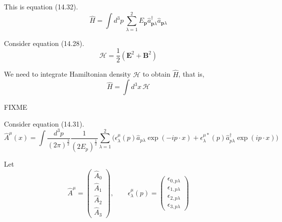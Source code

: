


\bigskip
This is equation (14.32).
\begin{equation*}
\hat H=\int d^3p\,\sum_{\lambda=1}^2E_{\mathbf p}\hat a_{\mathbf p\lambda}^\dag\hat a_{\mathbf p\lambda}
\tag{14.32}
\end{equation*}

Consider equation (14.28).
\begin{equation*}
\mathcal H=\frac{1}{2}(\mathbf E^2+\mathbf B^2)
\tag{14.28}
\end{equation*}

We need to integrate Hamiltonian density $\mathcal H$ to obtain $\hat H$, that is,
\begin{equation*}
\hat H=\int d^3x\,\mathcal H
\end{equation*}

FIXME



Consider equation (14.31).
\begin{equation*}
\hat A^\mu(x)=\int\frac{d^3p}{(2\pi)^\frac{3}{2}}\frac{1}{(2E_p)^\frac{1}{2}}
\sum_{\lambda=1}^2
\big(
\epsilon_\lambda^\mu(p)\hat a_{p\lambda}\exp(-ip\cdot x)
+\epsilon_\lambda^{\mu*}(p)\hat a_{p\lambda}^\dag\exp(ip\cdot x)
\big)
\tag{14.31}
\end{equation*}

Let
\begin{equation*}
\hat A^\mu=\begin{pmatrix}\hat A_0\\\hat A_1\\\hat A_2\\\hat A_3\end{pmatrix},
\qquad
\epsilon_\lambda^\mu(p)=\begin{pmatrix}
\epsilon_{0,p\lambda}\\\epsilon_{1,p\lambda}\\\epsilon_{2,p\lambda}\\\epsilon_{3,p\lambda}
\end{pmatrix}
\end{equation*}

